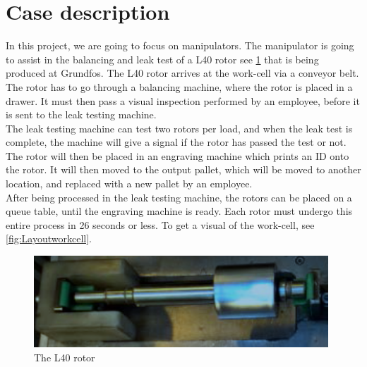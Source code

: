 \section{Case description} \label{ch:case description}

In this project, we are going to focus on manipulators.
The manipulator is going to assist in the balancing and leak test of a L40 rotor see \ref{fig:rotor} that is being produced at Grundfos. The L40 rotor arrives at the work-cell via a conveyor belt. The rotor has to go through a balancing machine, where the rotor is placed in a drawer. It must then pass a visual inspection performed by an employee, before it is sent to the leak testing machine.\\
The leak testing machine can test two rotors per load, and when the leak test is complete, the machine will give a signal if the rotor has passed the test or not. The rotor will then be placed in an engraving machine which prints an ID onto the rotor. It will then moved to the output pallet, which will be moved to another location, and replaced with a new pallet by an employee.\\ 
After being processed in the leak testing machine, the rotors can be placed on a queue table, until the engraving machine is ready. Each rotor must undergo this entire process in 26 seconds or less. To get a visual of the work-cell, see \ref{fig:Layoutworkcell}.\\

\begin{figure}
    \centering
    \includegraphics[width=.48\textwidth]{InitialProblemstatement/Case/rotorlille.PNG}
    \caption{The L40 rotor}
    \label{fig:rotor}
\end{figure}

